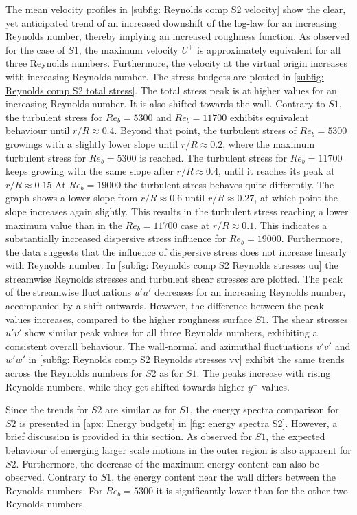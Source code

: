 The mean velocity profiles in \autoref{subfig: Reynolds comp S2 velocity} show the clear, yet anticipated trend of an increased downshift of the log-law for an increasing Reynolds number, thereby implying an increased roughness function.
As observed for the case of $S1$, the maximum velocity $U^+$ is approximately equivalent  for all three Reynolds numbers.
Furthermore, the velocity at the virtual origin increases with increasing Reynolds number.
The stress budgets are plotted in \autoref{subfig: Reynolds comp S2 total stress}.
The total stress peak is at higher values for an increasing Reynolds number.
It is also shifted towards the wall.
Contrary to $S1$, the turbulent stress for $Re_b = 5300$ and $Re_b = 11700$ exhibits equivalent behaviour until $r/R \approx 0.4$.
Beyond that point, the turbulent stress of $Re_b = 5300$ growings with a slightly lower slope until $r/R \approx 0.2$, where the maximum turbulent stress for $Re_b = 5300$ is reached.
The turbulent stress for $Re_b = 11700$ keeps growing with the same slope after $r/R \approx 0.4$, until it reaches its peak at $r/R \approx 0.15$
At $Re_b = 19000$ the turbulent stress behaves quite differently.
The graph shows a lower slope from $r/R \approx 0.6$ until $r/R \approx 0.27$, at which point the slope increases again slightly. 
This results in the turbulent stress reaching a lower maximum value than in the $Re_b = 11700$ case at $r/R \approx 0.1$.
This indicates a substantially increased dispersive stress influence for $Re_b = 19000$.
Furthermore, the data suggests that the influence of dispersive stress does not increase linearly with Reynolds number.
In \autoref{subfig: Reynolds comp S2 Reynolds stresses uu} the streamwise Reynolds stresses and turbulent shear stresses are plotted.
The peak of the streamwise fluctuations $u'u'$ decreases for an increasing Reynolds number, accompanied by a shift outwards.
However, the difference between the peak values increases, compared to the higher roughness surface $S1$.
The shear stresses $u'v'$ show similar peak values for all three Reynolds numbers, exhibiting a consistent overall behaviour.
The wall-normal and azimuthal fluctuations $v'v'$ and $w'w'$ in \autoref{subfig: Reynolds comp S2 Reynolds stresses vv} exhibit the same trends across the Reynolds numbers for $S2$ as for $S1$.
The peaks increase with rising Reynolds numbers, while they get shifted towards higher $y^+$ values.

Since the trends for $S2$ are similar as for $S1$, the energy spectra comparison  for $S2$ is presented in \autoref{apx: Energy budgets} in \autoref{fig: energy spectra S2}.
However, a brief discussion is provided in this section.
As observed for $S1$, the expected behaviour of emerging larger scale motions in the outer region is also apparent for $S2$.
Furthermore, the decrease of the maximum energy content can also be observed.
Contrary to $S1$, the energy content near the wall differs between the Reynolds numbers.
For $Re_b = 5300$ it is significantly lower than for the other two Reynolds numbers.


